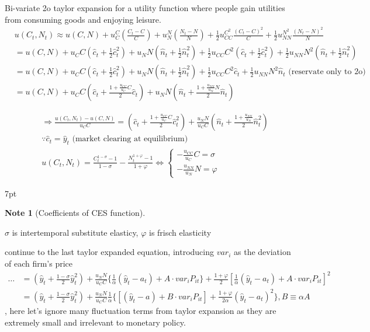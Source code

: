 \documentclass{article}
\newenvironment{blueblock}{
\def\FrameCommand{
  \hspace{1pt}
    {\color{DarkBlue}
    \vrule width 2pt}
    {\color{blueshade}
    \vrule width 4pt}
  \colorbox{blueshade}
}
\MakeFramed{
  \advance
  \hsize-
  \width
  \FrameRestore}
\noindent\hspace{-4.55pt}%
\begin{adjustwidth}{}{7pt}
\vspace{2pt}\vspace{2pt}
}
{\vspace{2pt}\end{adjustwidth}\endMakeFramed}
\newtheorem{note}{Note}
\begin{document}
Bi-variate 2o taylor expansion for a utility function where people gain utilities from consuming goods and enjoying leisure.
\begin{align}
& u(C_t,N_t)\approx u(C,N)+u_C^C (\frac{C_t -C}{C})+u_N^N(\frac{N_t -N}{N})+\frac{1}{2}u_{CC}^{C^2}\frac{(C_t-C)^2}{C}+\frac{1}{2}u_{NN}^{N^2}\frac{(N_t-N)^2}{N}
\\& = u(C,N)+u_C C(\hat c_t +\frac{1}{2}\hat c_t^2)+u_N N(\hat n_t +\frac{1}{2} \hat n_t^2)+\frac{1}{2}u_{CC} C^2(\hat c_t +\frac{1}{2}\hat c_t^2)+\frac{1}{2}u_{NN} N^2(\hat n_t +\frac{1}{2}\hat n_t^2)
\\& = u(C,N)+u_C C(\hat c_t +\frac{1}{2}\hat c_t^2)+u_N N(\hat n_t +\frac{1}{2} \hat n_t^2)+\frac{1}{2}u_{CC} C^2 \hat c_t+\frac{1}{2}u_{NN} N^2 \hat n_t
\text{ (reservate only to 2o)}
\\& = u(C,N)+u_C C(\hat c_t + \frac{1+\frac{u_{CC}}{u_C}C}{2}\hat c_t)+u_N N(\hat n_t + \frac{1+\frac{u_{NN}}{u_N}N}{2}\hat n_t)
\end{align}

\begin{align}
& \Rightarrow \frac{u(C_t,N_t)-u(C,N)}{u_C C}
= (\hat c_t + \frac{1+\frac{u_{CC}}{u_C}C}{2}\hat c_t^2)+\frac{u_N N}{u_C C}(\hat n_t + \frac{1+\frac{u_{NN}}{u_N}}{2}\hat n^2_t)
\\& \because \hat c_t = \hat y_t \text{ (market clearing at equilibrium)}
\\&
u(C_t,N_t)=\frac{C_t^{1-\sigma}-1}{1-\sigma}-\frac{N_t^{1+\varphi}-1}{1+\varphi}
\iff 
\begin{cases}
-\frac{u_{CC}}{u_C}C=\sigma\\
-\frac{u_{NN}}{u_N}N=\varphi
\end{cases}
\end{align}

\begin{blueblock}
\begin{note}[Coefficients of CES function]
\end{note}
$\sigma$ is intertemporal substitute elasticy, $\varphi$ is frisch elasticity
\end{blueblock}

continue to the last taylor expanded equation, introducing $var_i$ as the deviation of each firm's price
\begin{align}
\dots &= (\hat y_t +\frac{1-\sigma}{2}\hat y_t^2)+\frac{u_N N}{u_C C}\{\frac{1}{\alpha}(\hat y_t -a_t)+A \cdot var_i P_{it}\}+\frac{1+\varphi}{2}[\frac{1}{\alpha}(\hat y_t - a_t)+A \cdot var_i P_{it}]^2
\\& = (\hat y_t +\frac{1-\sigma}{2}\hat y_t^2)+\frac{u_N N}{u_C C}\frac{1}{\alpha}\{[(\hat y_t -a)+B \cdot var_i P_{it}]+\frac{1+\varphi}{2 \alpha}(\hat y_t -a_t)^2\}, B\equiv \alpha A
\end{align}
, here let's ignore many fluctuation terms from taylor expansion as they are extremely small and irrelevant to monetary policy.
\end{document}
